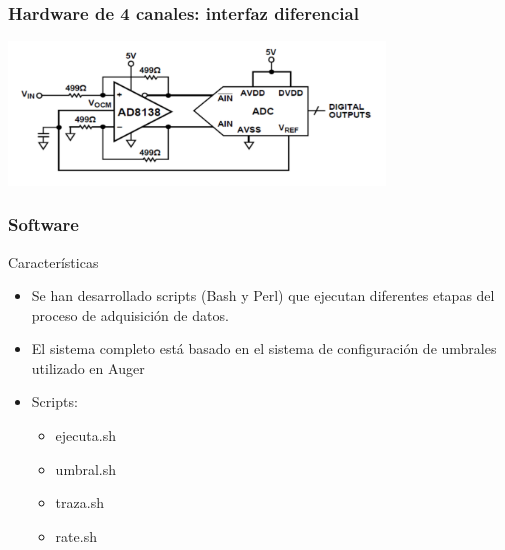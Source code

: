 \documentclass{beamer}
\begin{document}
\begin{frame}
  \frametitle{Hardware de 4 canales: interfaz diferencial}
  \begin{block}{}
    \begin{center}
    \includegraphics[height=0.50\textheight,width=0.75\textwidth]{d5/configuracion_diferencial_lago_mx}
		\end{center}
  \end{block}
\end{frame}

\begin{frame}
	\frametitle{Software}
		\begin{exampleblock}{Características}
			\begin{itemize}
				\item Se han desarrollado scripts (\alert{Bash} y \alert{Perl}) que
							ejecutan diferentes etapas del
							proceso de adquisición de datos.
				\item El sistema completo está basado en el sistema de configuración de
							umbrales utilizado en Auger
				\item Scripts:
							\begin{itemize}
								\item ejecuta.sh
								\item umbral.sh
								\item traza.sh
								\item rate.sh
							\end{itemize}
			\end{itemize}
		\end{exampleblock}
\end{frame}
\end{document}
